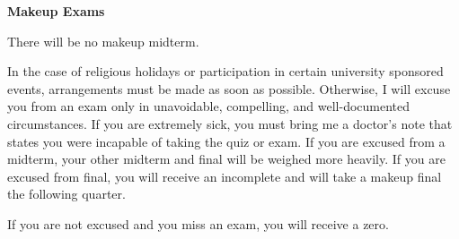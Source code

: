 \documentclass{article}
\begin{document}
\textbf{Makeup Exams}

There will be no makeup midterm.

In the case of religious holidays or participation in certain university
sponsored events, arrangements must be made as soon as possible. Otherwise, I
will excuse you from an exam only in unavoidable, compelling, and
well-documented circumstances. If you are extremely sick, you must bring me a
doctor's note that states you were incapable of taking the quiz or exam. If you
are excused from a midterm, your other midterm and final will be weighed more
heavily. If you are excused from final, you will receive an incomplete and will
take a makeup final the following quarter.

If you are not excused and you miss an exam, you will receive a zero.
\end{document}
